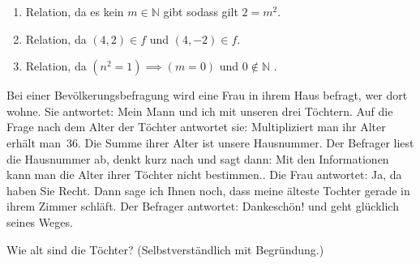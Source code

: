 \bigskip 

\begin{lsg}\hfill
    \begin{enumerate}[label=$\mathrm{(\roman*)}$]
        \item Relation, da es kein $m \in \mathbb{N}$ gibt sodass gilt $2 = m^2$.
        \item Relation, da $(4,2)\in f$ und $(4,-2)\in f$.
        \item Relation, da $(n^2 = 1) \implies (m = 0)$ und $0 \notin \mathbb{N}$ .
    \end{enumerate}
\end{lsg}

\bigskip

\begin{aufg}[6 Punkte]
Bei einer Bev\"olkerungsbefragung wird eine Frau in ihrem Haus befragt, wer dort wohne. Sie antwortet: \glqq Mein Mann und ich mit unseren drei T\"ochtern.\grqq{} Auf die Frage nach dem Alter der T\"ochter antwortet sie: \glqq Multipliziert man ihr Alter erh\"alt man~$36$. Die Summe ihrer Alter ist unsere Hausnummer.\grqq{} Der Befrager liest die Hausnummer ab, denkt kurz nach und sagt dann: \glqq Mit den Informationen kann man die Alter ihrer T\"ochter nicht bestimmen.\grqq{}. Die Frau antwortet: \glqq Ja, da haben Sie Recht. Dann sage ich Ihnen noch, dass meine \"alteste Tochter gerade in ihrem Zimmer schl\"aft.\grqq{} Der Befrager antwortet: \glqq Dankesch\"on!\grqq{} und geht gl\"ucklich seines Weges. 

Wie alt sind die T\"ochter? (Selbstverst\"andlich mit Begr\"undung.)
\end{aufg}

\bigskip

